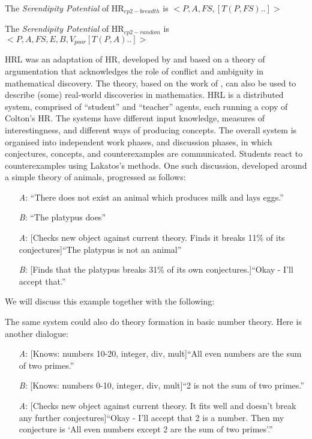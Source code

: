 The {\em Serendipity Potential} of HR$_{ep2-breadth}$ is 
$<P, A, FS,
[T(P, FS)..]>$

The {\em Serendipity Potential} of HR$_{ep2-random}$ is 
$<P, A, FS, E, B, V_{poor}
[T(P, A)..]>$

\begin{ep}\label{ex:platypus}
{\sf HRL} was an adaptation of {\sf HR}, developed by \citet{pease07} and 
based on a theory of argumentation that acknowledges the role of conflict and ambiguity in mathematical discovery.  The theory, based on the work of
\citet{lakatos}, can also be used to describe (some) real-world
discoveries in mathematics.  {\sf HRL} is a distributed system,
comprised of ``student'' and ``teacher'' agents, each running a copy
of Colton's {\sf HR}.  The systems have different input knowledge,
measures of interestingness, and different ways of producing concepts.
The overall system is organised into independent work phases, and
discussion phases, in which conjectures, concepts, and counterexamples
are communicated.  Students react to counterexamples using Lakatos's
methods.  One such discussion, developed around a simple theory of
animals, progressed as follows:
\begin{itemize}
\item[\emph{A}:] ``There does not exist an animal which produces milk and lays eggs.''
\item[\emph{B}:] ``The platypus does''
\item[\emph{A}:] {[}Checks new object against current theory. Finds it breaks 11\% of its conjectures{]}\newline ``The platypus is not an animal''
\item[\emph{B}:] {[}Finds that the platypus breaks 31\% of its own conjectures.{]}\newline ``Okay - I'll accept that.''
\end{itemize}
\end{ep}

We will discuss this example together with the following:

\begin{ep}\label{ex:goldbach}
The same system could also do theory formation in basic number theory.
Here is another dialogue:
\begin{itemize}
\item[\emph{A}:] {[}Knows: numbers 10-20, integer, div, mult{]}\newline ``All even numbers are the sum of two primes.''
\item[\emph{B}:] {[}Knows: numbers 0-10, integer, div, mult{]}\newline ``2 is not the sum of two primes.''
\item[\emph{A}:] {[}Checks new object against current theory. It fits well and doesn't break any further conjectures{]}\newline ``Okay - I'll accept that 2 is a number. Then my conjecture is `All even numbers except 2 are the sum of two primes'.''
\end{itemize}
\end{ep}

